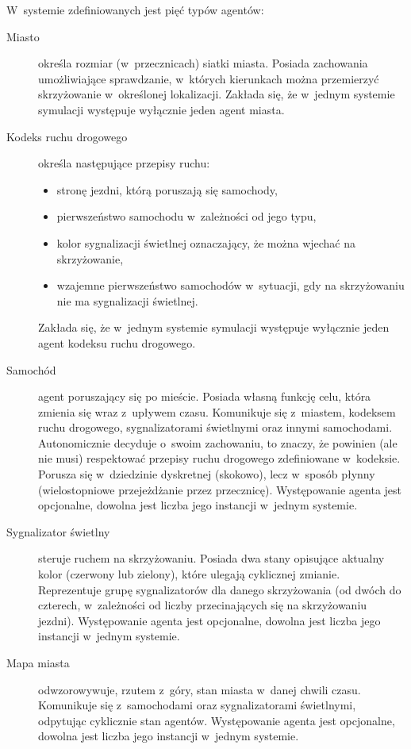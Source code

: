 \documentclass[a4paper,11pt]{article}
\begin{document}
W~systemie zdefiniowanych jest pięć typów agentów:

\begin{description}
    \item[Miasto] określa rozmiar (w~przecznicach) siatki miasta. Posiada zachowania umożliwiające sprawdzanie, w~których kierunkach można przemierzyć skrzyżowanie w~określonej lokalizacji. Zakłada się, że w~jednym systemie symulacji występuje wyłącznie jeden agent miasta.
    \item[Kodeks ruchu drogowego] określa następujące przepisy ruchu:
        \begin{itemize}
            \item stronę jezdni, którą poruszają się samochody,
            \item pierwszeństwo samochodu w~zależności od jego typu,
            \item kolor sygnalizacji świetlnej oznaczający, że można wjechać na skrzyżowanie,
            \item wzajemne pierwszeństwo samochodów w~sytuacji, gdy na skrzyżowaniu nie ma sygnalizacji świetlnej.
        \end{itemize}

        Zakłada się, że w~jednym systemie symulacji występuje wyłącznie jeden agent kodeksu ruchu drogowego.
    \item[Samochód] agent poruszający się po mieście. Posiada własną funkcję celu, która zmienia się wraz z~upływem czasu. Komunikuje się z~miastem, kodeksem ruchu drogowego, sygnalizatorami świetlnymi oraz innymi samochodami. Autonomicznie decyduje o~swoim zachowaniu, to znaczy, że powinien (ale nie musi) respektować przepisy ruchu drogowego zdefiniowane w~kodeksie. Porusza się w~dziedzinie dyskretnej (skokowo), lecz w~sposób płynny (wielostopniowe przejeżdżanie przez przecznicę). Występowanie agenta jest opcjonalne, dowolna jest liczba jego instancji w~jednym systemie.
    \item[Sygnalizator świetlny] steruje ruchem na skrzyżowaniu. Posiada dwa stany opisujące aktualny kolor (czerwony lub zielony), które ulegają cyklicznej zmianie. Reprezentuje grupę sygnalizatorów dla danego skrzyżowania (od dwóch do czterech, w~zależności od liczby przecinających się na skrzyżowaniu jezdni). Występowanie agenta jest opcjonalne, dowolna jest liczba jego instancji w~jednym systemie.
    \item[Mapa miasta] odwzorowywuje, rzutem z~góry, stan miasta w~danej chwili czasu. Komunikuje się z~samochodami oraz sygnalizatorami świetlnymi, odpytując cyklicznie stan agentów. Występowanie agenta jest opcjonalne, dowolna jest liczba jego instancji w~jednym systemie.
\end{description}
\end{document}
